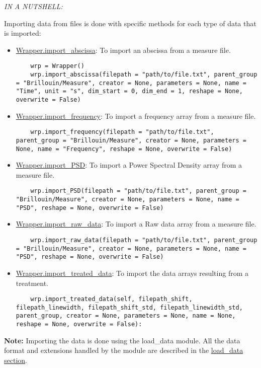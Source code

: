\begin{tcolorbox}
    \textit{IN A NUTSHELL:}

    Importing data from files is done with specific methods for each type of data that is imported:
    \begin{itemize}
        \item \hyperref[subsec:wrapper.import_abscissa]{Wrapper.import\_abscissa}: To import an abscissa from a measure file.
\begin{lstlisting}
    wrp = Wrapper()
    wrp.import_abscissa(filepath = "path/to/file.txt", parent_group = "Brillouin/Measure", creator = None, parameters = None, name = "Time", unit = "s", dim_start = 0, dim_end = 1, reshape = None, overwrite = False)
\end{lstlisting}
        \item \hyperref[subsec:wrapper.import_frequency]{Wrapper.import\_frequency}: To import a frequency array from a measure file.
\begin{lstlisting}
    wrp.import_frequency(filepath = "path/to/file.txt", parent_group = "Brillouin/Measure", creator = None, parameters = None, name = "Frequency", reshape = None, overwrite = False)
\end{lstlisting}
        \item \hyperref[subsec:wrapper.import_psd]{Wrapper.import\_PSD}: To import a Power Spectral Density array from a measure file.
\begin{lstlisting}
    wrp.import_PSD(filepath = "path/to/file.txt", parent_group = "Brillouin/Measure", creator = None, parameters = None, name = "PSD", reshape = None, overwrite = False)
\end{lstlisting}
        \item \hyperref[subsec:wrapper.import_raw_data]{Wrapper.import\_raw\_data}: To import a Raw data array from a measure file.
\begin{lstlisting}
    wrp.import_raw_data(filepath = "path/to/file.txt", parent_group = "Brillouin/Measure", creator = None, parameters = None, name = "PSD", reshape = None, overwrite = False)
\end{lstlisting}
        \item \hyperref[subsec:wrapper.import_treated_data]{Wrapper.import\_treated\_data}: To import the data arrays resulting from a treatment.
\begin{lstlisting}
    wrp.import_treated_data(self, filepath_shift, filepath_linewidth, filepath_shift_std, filepath_linewidth_std, parent_group, creator = None, parameters = None, name = None, reshape = None, overwrite = False):
\end{lstlisting}
    \end{itemize}

    \textbf{Note:} Importing the data is done using the load\_data module. All the data format and extensions handled by the module are described in the \hyperref[chap:load_data]{load\_data section}.
\end{tcolorbox}
    
